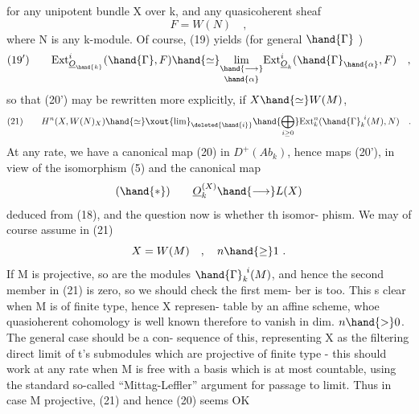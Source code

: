 
for any unipotent bundle X over k,  and any quasicoherent sheaf
\[ F = W(N) \quad , \]
where N is any k-module.  Of course, (19)  yields (for general $\hand{\Gamma}$ )
\[ (19') \qquad \mathrm{Ext}^{i}_{\underline{O}_{\hand{k}}}( \hand{\Gamma} , F) \hand{\simeq} \underset{\hand{\alpha}}{\underset{\hand{\longrightarrow}}{\mathrm{lim}}} \mathrm{Ext}^{i}_{\underline{O}_k}( \hand{\Gamma}_{\hand{\alpha}} , F) \quad , \]
so that (20')  may be rewritten more explicitly,  if  $X \hand{\simeq} W(M)$, 
\[ (21) \qquad H^{n}(X,W(N)_X) \hand{\simeq} \xout{\mathrm{lim}}_{\deleted{\hand{i}}} \hand{\bigoplus_{i\geq 0}} \mathrm{Ext}^{n}_{k}(\hand{\Gamma}_k^{\ i}(M),N) \quad . \]
At any rate,  we have a canonical map (20) in $D^{+}(Ab_k)$,  hence maps
(20'),  in view of the isomorphism (5)  and the canonical map
\[ (\hand{*}) \qquad \underline{O}_k^{(X)} \hand{\longrightarrow} L(X) \]
deduced from (18),  and the question now is whether th  isomor-%
phism.  We may of course assume  in (21)
\[ X = W(M) \quad , \quad n \hand{\geq} 1 \ . \]
If M is projective,  so are the modules $\hand{\Gamma}_k^{\ i}(M)$,  and hence 
the second  member in (21) is zero,  so we should check the first mem-%
ber is too.  This s clear when M is of finite type,  hence X represen-%
table by an affine scheme,  whoe quasioherent cohomology is well known
therefore to vanish in dim. $n \hand{>} 0$.  The  general case should be a con-%
sequence of this,  representing X as the filtering direct limit of
t's submodules which are projective of finite type  -  this should work
at any rate when M is free with a basis which is at most countable,
using the standard so-called ``Mittag-Leffler'' argument for passage to
limit.   Thus in case M projective,  (21)  and hence (20) seems OK
